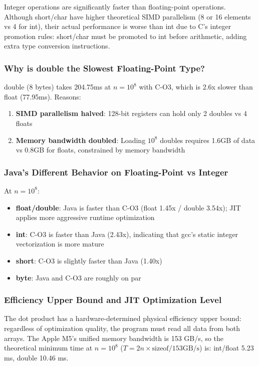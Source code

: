 \documentclass[12pt,a4paper]{article}
\begin{document}
Integer operations are significantly faster than floating-point operations. Although short/char have higher theoretical SIMD parallelism (8 or 16 elements vs 4 for int), their actual performance is worse than int due to C's integer promotion rules: short/char must be promoted to int before arithmetic, adding extra type conversion instructions.

\subsubsection*{Why is double the Slowest Floating-Point Type?}

double (8 bytes) takes 204.75ms at $n=10^8$ with C-O3, which is 2.6x slower than float (77.95ms). Reasons:
\begin{enumerate}
  \item \textbf{SIMD parallelism halved}: 128-bit registers can hold only 2 doubles vs 4 floats
  \item \textbf{Memory bandwidth doubled}: Loading $10^8$ doubles requires 1.6GB of data vs 0.8GB for floats, constrained by memory bandwidth
\end{enumerate}

\subsubsection*{Java's Different Behavior on Floating-Point vs Integer}

At $n=10^8$:
\begin{itemize}
  \item \textbf{float/double}: Java is faster than C-O3 (float 1.45x / double 3.54x); JIT applies more aggressive runtime optimization
  \item \textbf{int}: C-O3 is faster than Java (2.43x), indicating that gcc's static integer vectorization is more mature
  \item \textbf{short}: C-O3 is slightly faster than Java (1.40x)
  \item \textbf{byte}: Java and C-O3 are roughly on par
\end{itemize}

\subsubsection*{Efficiency Upper Bound and JIT Optimization Level}

The dot product has a hardware-determined physical efficiency upper bound: regardless of optimization quality, the program must read all data from both arrays. The Apple M5's unified memory bandwidth is 153 GB/s, so the theoretical minimum time at $n=10^8$ ($T = 2n \times \text{sizeof} / 153\text{GB/s}$) is: int/float 5.23 ms, double 10.46 ms.
\end{document}
